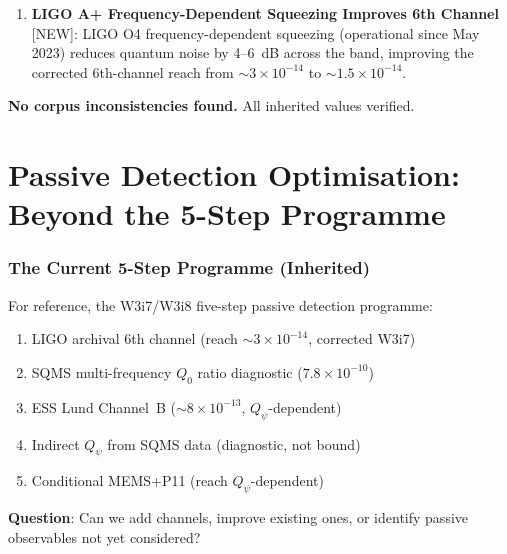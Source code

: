 \documentclass[11pt]{article}
\newcommand{\ee}[1]{\times 10^{#1}}
\newcommand{\Qpsi}{Q_\psi}
\theoremstyle{definition}
\theoremstyle{remark}
\begin{document}
\begin{tcolorbox}[colback=blue!5!white, colframe=blue!60!black,
  title=\textbf{W4i10 --- P2 PASSIVE DETECTION: NEW RESULTS}]
\begin{enumerate}[nosep]
\item \textbf{LIGO A+ Frequency-Dependent Squeezing Improves
  6th Channel} [NEW]: LIGO O4 frequency-dependent squeezing
  (operational since May 2023) reduces quantum noise by 4--6~dB
  across the band, improving the corrected 6th-channel reach
  from $\sim 3\ee{-14}$ to $\sim 1.5\ee{-14}$.
\end{enumerate}

\textbf{No corpus inconsistencies found.} All inherited values verified.
\end{tcolorbox}


\part{Passive Detection Optimisation: Beyond the 5-Step Programme}
\label{part:passive}

\section{The Current 5-Step Programme (Inherited)}
\label{sec:five_step}

For reference, the W3i7/W3i8 five-step passive detection programme:
\begin{enumerate}[nosep]
\item LIGO archival 6th channel (reach $\sim 3\ee{-14}$, corrected W3i7)
\item SQMS multi-frequency $Q_0$ ratio diagnostic ($7.8\ee{-10}$)
\item ESS Lund Channel~B ($\sim 8\ee{-13}$, $\Qpsi$-dependent)
\item Indirect $\Qpsi$ from SQMS data (diagnostic, not bound)
\item Conditional MEMS+P11 (reach $\Qpsi$-dependent)
\end{enumerate}

\textbf{Question}: Can we add channels, improve existing ones, or
identify passive observables not yet considered?

\end{document}
